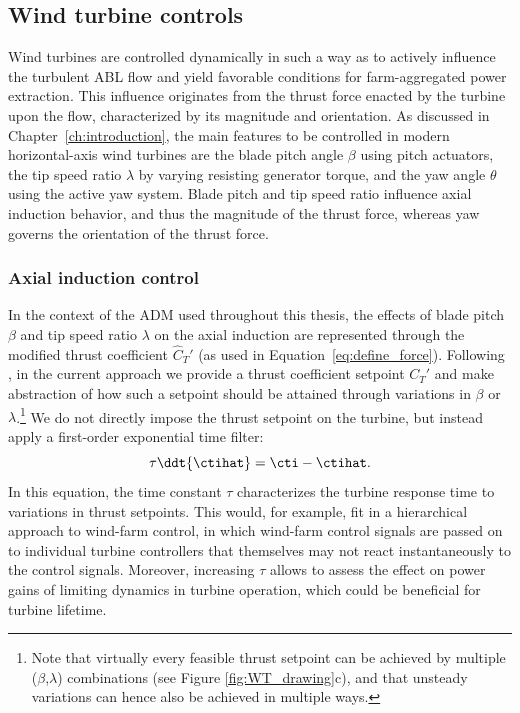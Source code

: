 \subsection{Wind turbine controls}
Wind turbines are controlled dynamically in such a way as to actively influence the turbulent ABL flow and yield favorable conditions for farm-aggregated power extraction. This influence originates from the thrust force enacted by the turbine upon the flow, characterized by its magnitude and orientation. 
As discussed in Chapter~\ref{ch:introduction}, the main features to be controlled in modern horizontal-axis wind turbines are the blade pitch angle $\beta$ using pitch actuators, the tip speed ratio $\lambda$ by varying resisting generator torque, and the yaw angle $\theta$ using the active yaw system. Blade pitch and tip speed ratio influence axial induction behavior, and thus the magnitude of the thrust force, whereas yaw governs the orientation of the thrust force. 

\subsubsection{Axial induction control}
In the context of the ADM used throughout this thesis, the effects of blade pitch $\beta$ and tip speed ratio $\lambda$ on the axial induction are represented through the modified thrust coefficient $\widehat{C}_T'$ (as used in Equation~\ref{eq:define_force}). Following \cite{goit2015optimal}, in the current approach we provide a thrust coefficient setpoint $C_T'$ and make abstraction of how such a setpoint should be attained through variations in $\beta$ or $\lambda$.\footnote{Note that virtually every feasible thrust setpoint can be achieved by multiple ($\beta$,$\lambda$) combinations (see Figure \ref{fig:WT_drawing}c), and that unsteady variations can hence also be achieved in multiple ways.} We do not directly impose the thrust setpoint on the turbine, but instead apply a first-order exponential time filter:
\begin{equation}
	\tau \ddt{\ctihat} = \cti - \ctihat \label{eq:timefilter_def}.
\end{equation}
In this equation, the time constant $\tau$ characterizes the turbine response time to variations in thrust setpoints. This would, for example, fit in a hierarchical approach to wind-farm control, in which wind-farm control signals are passed on to individual turbine controllers that themselves may not react instantaneously to the control signals. Moreover, increasing $\tau$ allows to assess the effect on power gains of limiting dynamics in turbine operation, which could be beneficial for turbine lifetime. 



